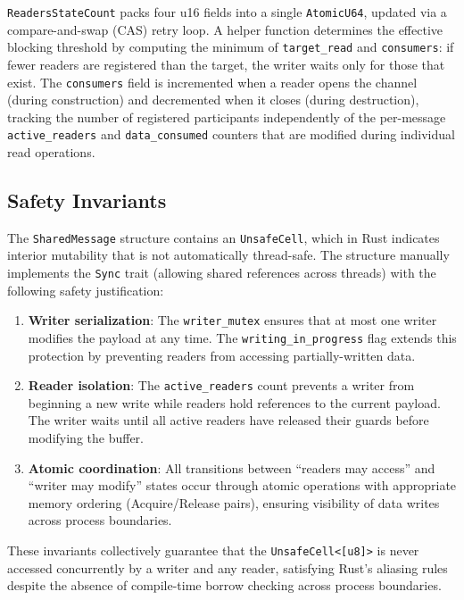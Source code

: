\texttt{ReadersStateCount} packs four u16 fields into a single \texttt{AtomicU64}, updated via a compare-and-swap (CAS) retry loop. A helper function determines the effective blocking threshold by computing the minimum of \texttt{target\_read} and \texttt{consumers}: if fewer readers are registered than the target, the writer waits only for those that exist. The \texttt{consumers} field is incremented when a reader opens the channel (during construction) and decremented when it closes (during destruction), tracking the number of registered participants independently of the per-message \texttt{active\_readers} and \texttt{data\_consumed} counters that are modified during individual read operations.

\subsection{Safety Invariants}
\label{subsec:safety}

The \texttt{SharedMessage} structure contains an \texttt{UnsafeCell}, which in Rust indicates interior mutability that is not automatically thread-safe. The structure manually implements the \texttt{Sync} trait (allowing shared references across threads) with the following safety justification:

\begin{enumerate}
    \item \textbf{Writer serialization}: The \texttt{writer\_mutex} ensures that at most one writer modifies the payload at any time. The \texttt{writing\_in\_progress} flag extends this protection by preventing readers from accessing partially-written data.

    \item \textbf{Reader isolation}: The \texttt{active\_readers} count prevents a writer from beginning a new write while readers hold references to the current payload. The writer waits until all active readers have released their guards before modifying the buffer.

    \item \textbf{Atomic coordination}: All transitions between ``readers may access'' and ``writer may modify'' states occur through atomic operations with appropriate memory ordering (Acquire/Release pairs), ensuring visibility of data writes across process boundaries.
\end{enumerate}

These invariants collectively guarantee that the \texttt{UnsafeCell<[u8]>} is never accessed concurrently by a writer and any reader, satisfying Rust's aliasing rules despite the absence of compile-time borrow checking across process boundaries.


